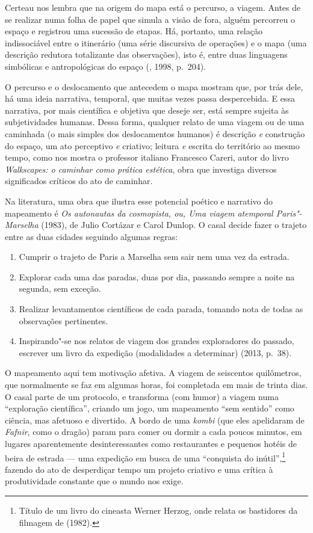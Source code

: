 Certeau nos lembra que na origem do mapa está o percurso, a viagem.
Antes de se realizar numa folha de papel que simula a visão de fora,
alguém percorreu o espaço e registrou uma sucessão de etapas. Há,
portanto, uma relação indissociável entre o itinerário (uma série
discursiva de operações) e o mapa (uma descrição redutora totalizante
das observações), isto é, entre duas linguagens simbólicas e
antropológicas do espaço (, 1998, p.~204).

O percurso e o deslocamento que antecedem o mapa mostram que, por trás
dele, há uma ideia narrativa, temporal, que muitas vezes passa
despercebida. E essa narrativa, por mais científica e objetiva que
deseje ser, está sempre sujeita às subjetividades humanas. Dessa forma,
qualquer relato de uma viagem ou de uma caminhada (o mais simples dos
deslocamentos humanos) é descrição \emph{e} construção do espaço, um ato
perceptivo \emph{e} criativo; leitura \emph{e} escrita do território ao
mesmo tempo, como nos mostra o professor italiano Francesco Careri,
autor do livro \emph{Walkscapes: o caminhar como prática
estética}, obra que investiga diversos significados críticos do ato de
caminhar.

Na literatura, uma obra que ilustra esse potencial poético e narrativo
do mapeamento é \emph{Os autonautas da cosmopista, ou, Uma viagem
atemporal Paris"-Marselha} (1983), de Julio Cortázar e Carol Dunlop. O
casal decide fazer o trajeto entre as duas cidades seguindo algumas
regras:

\begin{enumerate}
\item[1.] Cumprir o trajeto de Paris a Marselha sem sair nem uma vez da
estrada.

\item[2.] Explorar cada uma das paradas, duas por dia, passando sempre a noite
na segunda, sem exceção.

\item[3.] Realizar levantamentos científicos de cada parada, tomando nota de
todas as observações pertinentes.

\item[4.] Inspirando"-se nos relatos de viagem dos grandes exploradores do
passado, escrever um livro da expedição (modalidades a determinar)
(2013, p.~38).
\end{enumerate}

O mapeamento aqui tem motivação afetiva. A viagem de seiscentos
quilômetros, que normalmente se faz em algumas horas, foi completada em
mais de trinta dias. O casal parte de um protocolo, e transforma (com
humor) a viagem numa ``exploração científica'', criando um jogo, um
mapeamento ``sem sentido'' como ciência, mas afetuoso e divertido. A
bordo de uma \emph{kombi} (que eles apelidaram de \emph{Fafnir}, como o
dragão) param para comer ou dormir a cada poucos minutos, em lugares
aparentemente desinteressantes como restaurantes e pequenos hotéis de
beira de estrada --- uma expedição em busca de uma ``conquista do
inútil'',\footnote{Título de um livro do cineasta Werner Herzog, onde
  relata os bastidores da filmagem de {} (1982).}
fazendo do ato de desperdiçar tempo um projeto criativo e uma crítica à
produtividade constante que o mundo nos exige.

